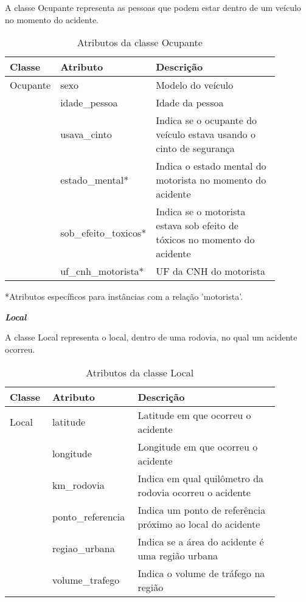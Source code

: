   A classe Ocupante representa as pessoas que podem estar dentro de um veículo no momento do acidente.
  
    \begin{table*}[!h]
    \centering
    \begin{tabular}{p{0.15\linewidth}p{0.23\linewidth}p{0.5\linewidth}}
      \hline
      \textbf{Classe} & \textbf{Atributo} & \textbf{Descrição}\\
      \hline
	Ocupante & sexo & Modelo do veículo\\
		 & idade\_pessoa & Idade da pessoa\\
		 & usava\_cinto & Indica se o ocupante do veículo estava usando o cinto de segurança\\
		 & estado\_mental* & Indica o estado mental do motorista no momento do acidente\\
		 & sob\_efeito\_toxicos* & Indica se o motorista estava sob efeito de tóxicos no momento do acidente\\
		 & uf\_cnh\_motorista* & UF da CNH do motorista\\
      \hline
    \end{tabular}
    *Atributos específicos para instâncias com a relação 'motorista'.

    \caption{Atributos da classe Ocupante}
    \label{tab:attr_ocupante}
    \end{table*}
    
\noindent
\emph{\textbf{Local}}

  A classe Local representa o local, dentro de uma rodovia, no qual um acidente ocorreu.
  
    \begin{table*}[!h]
    \centering
    \begin{tabular}{p{0.15\linewidth}p{0.23\linewidth}p{0.5\linewidth}}
      \hline
      \textbf{Classe} & \textbf{Atributo} & \textbf{Descrição}\\
      \hline
	Local & latitude & Latitude em que ocorreu o acidente\\
	      & longitude & Longitude em que ocorreu o acidente\\
	      & km\_rodovia & Indica em qual quilômetro da rodovia ocorreu o acidente\\
	      & ponto\_referencia & Indica um ponto de referência próximo ao local do acidente\\
	      & regiao\_urbana & Indica se a área do acidente é uma região urbana\\
	      & volume\_trafego & Indica o volume de tráfego na região\\
      \hline
    \end{tabular}
    \caption{Atributos da classe Local}
    \label{tab:attr_local}
    \end{table*}

